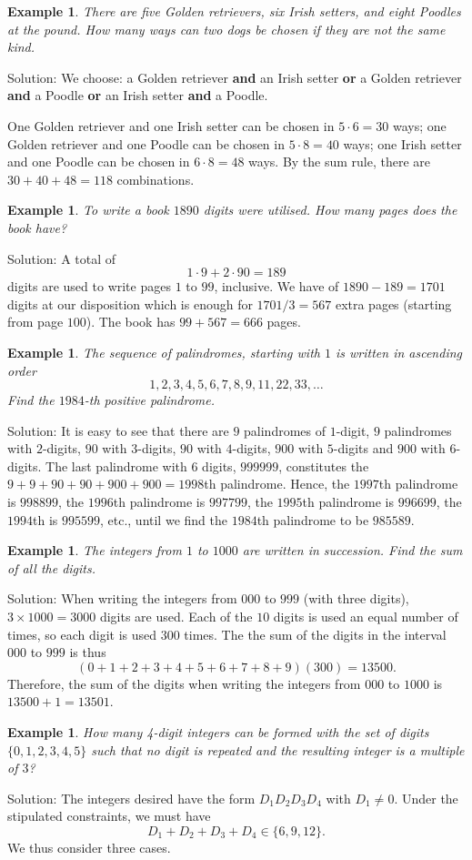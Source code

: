 \documentclass[11pt, openany]{book}
\theoremstyle{change} \theoremheaderfont{\blue\sffamily\bfseries}
\newtheorem{exa}[thm]{Example}
\theoremstyle{nonumberplain} \theoremheaderfont{\sffamily\bfseries}
\newcommand{\í}{\'{\i}}
\begin{document}
\begin{exa} There are five Golden retrievers, six Irish setters, and eight
Poodles at the pound. How many ways can two dogs be chosen if they
are not the same kind. \end{exa} Solution: We choose: a Golden
retriever {\bf and} an Irish setter {\bf or} a Golden retriever {\bf
and} a Poodle {\bf or} an Irish setter {\bf and} a Poodle.

\bigskip
One Golden retriever and one Irish setter can be chosen in $5 \cdot
6 = 30$ ways; one Golden retriever and one Poodle can be chosen in
$5 \cdot 8 = 40$ ways; one Irish setter and one Poodle can be chosen
in $6 \cdot 8 = 48$ ways.  By the sum rule, there are $30 + 40 + 48
= 118$ combinations.
\begin{exa} To write a book $1890$ digits were utilised. How many pages does the book have?
\end{exa}
Solution: A total of $$1\cdot 9 + 2\cdot 90  = 189$$digits are used
to write pages $1$ to $99$, inclusive. We have of $1890 - 189 =
1701$ digits at our disposition which is enough for $1701/3  = 567$
extra pages (starting from page $100$). The book has $99 + 567 =
666$ pages.

\begin{exa}
 The sequence of palindromes, starting with $1$ is
written in ascending order
$$1, 2, 3, 4, 5, 6, 7, 8, 9, 11, 22, 33, \ldots $$
Find the $1984$-th positive palindrome.
\end{exa}Solution: It is easy to see that there are $9$ palindromes of $1$-digit, $9$ palindromes with $2$-digits,
$90$ with $3$-digits, $9$0 with $4$-digits, $900$ with $5$-digits
and $900$ with $6$-digits. The last palindrome with $6$ digits,
$999999$, constitutes the $9 + 9 + 90 + 90 + 900 + 900 = 1998$th
palindrome. Hence, the $1997$th palindrome is $998899$, the $1996$th
palindrome is $997799$, the $1995$th palindrome is $996699$, the
$1994$th is $995599$, etc., until we find the $1984$th palindrome to
be $985589$.

\begin{exa}
The integers from $1$ to $1000$ are written in succession. Find the
sum of all the digits.\end{exa} Solution: When writing the integers
from $000$ to $999$ (with three digits), $3\times 1000 = 3000$
digits are used. Each of the $10$ digits is used an equal number of
times, so each digit is used $300$ times. The the sum of the digits
in the interval $000$ to $999$ is thus
$$(0 + 1 + 2 + 3+ 4 + 5+ 6+ 7 + 8 + 9)(300) = 13500.
$$Therefore, the sum of the digits when writing the integers from
$000$ to $1000$ is $13500 + 1 = 13501$.
\begin{exa}How many 4-digit integers can be formed with the set
of digits $\{0, 1, 2, 3, 4, 5\}$ such that no digit is repeated and
the resulting integer is a multiple of $3$? \end{exa} Solution: The
integers desired have the form $D_1D_2D_3D_4$ with $D_1 \neq 0$.
Under the stipulated constraints, we must have
$$D_1 + D_2 + D_3 + D_4\in\{6, 9, 12\}.$$ We thus consider three
cases.
\end{document}
